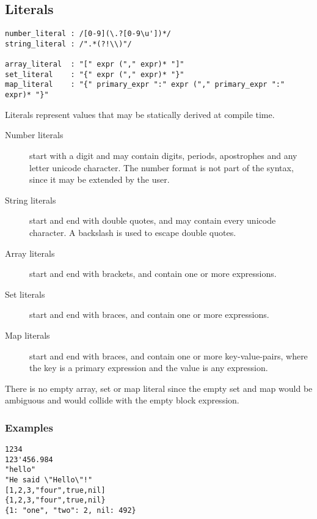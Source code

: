 \subsection{Literals}

\begin{lstlisting}[language=EBNF]
number_literal : /[0-9](\.?[0-9\u'])*/
string_literal : /".*(?!\\)"/

array_literal  : "[" expr ("," expr)* "]"
set_literal    : "{" expr ("," expr)* "}"
map_literal    : "{" primary_expr ":" expr ("," primary_expr ":" expr)* "}"
\end{lstlisting}

Literals represent values that may be statically derived at compile time.

\begin{description}
	\item[Number literals] start with a digit and may contain digits, periods,
		apostrophes and any letter unicode character. The number format is not
		part of the syntax, since it may be extended by the user.
	\item[String literals] start and end with double quotes, and may contain
		every unicode character. A backslash is used to escape double quotes.
	\item[Array literals] start and end with brackets, and contain one or more
		expressions.
	\item[Set literals] start and end with braces, and contain one or more
		expressions.
	\item[Map literals] start and end with braces, and contain one or more
		key-value-pairs, where the key is a primary expression and the value is
		any expression.
\end{description}

There is no empty array, set or map literal since the empty set and map would be
ambiguous and would collide with the empty block expression.

\subsubsection{Examples}

\begin{lstlisting}
1234
123'456.984
"hello"
"He said \"Hello\"!"
[1,2,3,"four",true,nil]
{1,2,3,"four",true,nil}
{1: "one", "two": 2, nil: 492}
\end{lstlisting}
